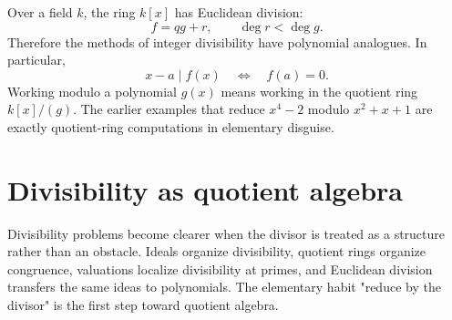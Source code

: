 Over a field \(k\), the ring \(k[x]\) has Euclidean division:
\[
  f=qg+r,\qquad \deg r<\deg g.
\]
Therefore the methods of integer divisibility have polynomial analogues.  In particular,
\[
  x-a\mid f(x)\quad\Longleftrightarrow\quad f(a)=0.
\]
Working modulo a polynomial \(g(x)\) means working in the quotient ring \(k[x]/(g)\).  The earlier examples that reduce \(x^4-2\) modulo \(x^2+x+1\) are exactly quotient-ring computations in elementary disguise.

\section{Divisibility as quotient algebra}

Divisibility problems become clearer when the divisor is treated as a structure rather than an obstacle.  Ideals organize divisibility, quotient rings organize congruence, valuations localize divisibility at primes, and Euclidean division transfers the same ideas to polynomials.  The elementary habit "reduce by the divisor" is the first step toward quotient algebra.
